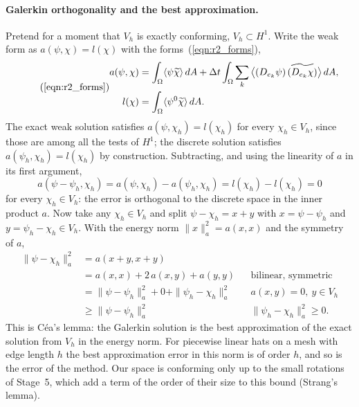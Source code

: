 \paragraph{Galerkin orthogonality and the best approximation.} Pretend for a moment that $V_h$ is exactly conforming, $V_h \subset H^1$. Write the weak form as $a(\psi, \chi) = l(\chi)$ with the forms~(\ref{eqn:r2_forms}),
\begin{equation*}
\tag{\ref{eqn:r2_forms}}
\begin{aligned}
a(\psi, \chi) &= \int_\Omega \langle\psi\widetilde\chi\rangle\, dA + \Delta t\int_\Omega \sum_k \big\langle (D_{e_k}\psi)\,\widetilde{(D_{e_k}\chi)}\big\rangle\, dA, \\
l(\chi) &= \int_\Omega \langle\psi^0\widetilde\chi\rangle\, dA .
\end{aligned}
\end{equation*}
The exact weak solution satisfies $a(\psi, \chi_h) = l(\chi_h)$ for every $\chi_h\in V_h$, since those are among all the tests of $H^1$; the discrete solution satisfies $a(\psi_h, \chi_h) = l(\chi_h)$ by construction. Subtracting, and using the linearity of $a$ in its first argument,
\begin{equation*}
a(\psi - \psi_h, \chi_h) = a(\psi, \chi_h) - a(\psi_h, \chi_h) = l(\chi_h) - l(\chi_h) = 0
\end{equation*}
for every $\chi_h \in V_h$: the error is orthogonal to the discrete space in the inner product $a$. Now take any $\chi_h \in V_h$ and split $\psi - \chi_h = x + y$ with $x = \psi - \psi_h$ and $y = \psi_h - \chi_h\in V_h$. With the energy norm $\|x\|_a^2 = a(x, x)$ and the symmetry of $a$,
\begin{align*}
\|\psi - \chi_h\|_a^2 &= a(x + y, x + y) \\
&= a(x, x) + 2\,a(x, y) + a(y, y) && \text{bilinear, symmetric} \\
&= \|\psi - \psi_h\|_a^2 + 0 + \|\psi_h - \chi_h\|_a^2 && a(x, y) = 0,\ y\in V_h \\
&\ge \|\psi - \psi_h\|_a^2 && \|\psi_h - \chi_h\|_a^2\ge 0 .
\end{align*}
This is C\'ea's lemma: the Galerkin solution is the best approximation of the exact solution from $V_h$ in the energy norm. For piecewise linear hats on a mesh with edge length $h$ the best approximation error in this norm is of order $h$, and so is the error of the method. Our space is conforming only up to the small rotations of Stage~5, which add a term of the order of their size to this bound (Strang's lemma).

